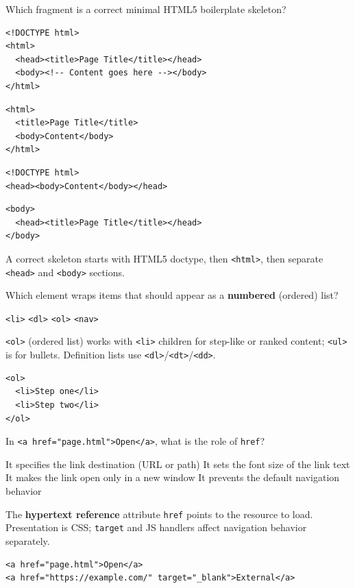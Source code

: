 \question[4]
Which fragment is a correct minimal HTML5 boilerplate skeleton?
\begin{choices}
  \CorrectChoice
\begin{lstlisting}[style=htmlinline]
<!DOCTYPE html>
<html>
  <head><title>Page Title</title></head>
  <body><!-- Content goes here --></body>
</html>
\end{lstlisting}
  \choice
\begin{lstlisting}[style=htmlinline]
<html>
  <title>Page Title</title>
  <body>Content</body>
</html>
\end{lstlisting}
  \choice
\begin{lstlisting}[style=htmlinline]
<!DOCTYPE html>
<head><body>Content</body></head>
\end{lstlisting}
  \choice
\begin{lstlisting}[style=htmlinline]
<body>
  <head><title>Page Title</title></head>
</body>
\end{lstlisting}
\end{choices}
\begin{solution}
  A correct skeleton starts with HTML5 doctype, then \texttt{<html>}, then separate \texttt{<head>} and \texttt{<body>} sections.
\end{solution}


\newpage

\question[4]
Which element wraps items that should appear as a \textbf{numbered} (ordered) list?
\begin{choices}
  \choice \texttt{<li>}
  \choice \texttt{<dl>}
  \CorrectChoice \texttt{<ol>}
  \choice \texttt{<nav>}
\end{choices}
\begin{solution}
  \texttt{<ol>} (ordered list) works with \texttt{<li>} children for step-like or ranked content; \texttt{<ul>} is for bullets. Definition lists use \texttt{<dl>}/\texttt{<dt>}/\texttt{<dd>}.
\begin{lstlisting}[style=htmlinline]
<ol>
  <li>Step one</li>
  <li>Step two</li>
</ol>
\end{lstlisting}
\end{solution}

\question[4]
In \texttt{<a href="page.html">Open</a>}, what is the role of \texttt{href}?
\begin{choices}
  \CorrectChoice It specifies the link destination (URL or path)
  \choice It sets the font size of the link text
  \choice It makes the link open only in a new window
  \choice It prevents the default navigation behavior
\end{choices}
\begin{solution}
  The \textbf{hypertext reference} attribute \texttt{href} points to the resource to load. Presentation is CSS; \texttt{target} and JS handlers affect navigation behavior separately.
\begin{lstlisting}[style=htmlinline]
<a href="page.html">Open</a>
<a href="https://example.com/" target="_blank">External</a>
\end{lstlisting}
\end{solution}

